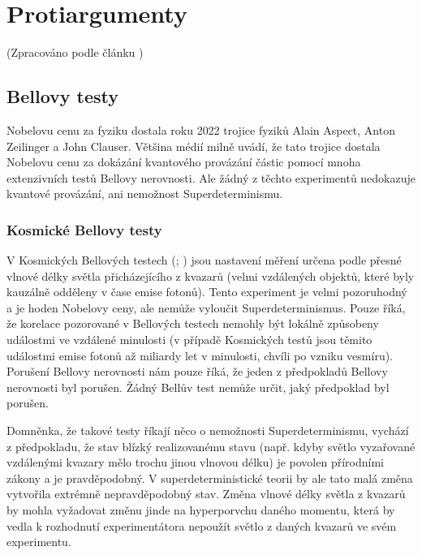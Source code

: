\section{Protiargumenty}
(Zpracováno podle článku \cite{supdet:rethink})
\subsection{Bellovy testy}


Nobelovu cenu za fyziku dostala roku 2022 trojice fyziků Alain Aspect, Anton Zeilinger a John Clauser. Většina médií milně uvádí, že tato trojice dostala Nobelovu cenu za dokázání kvantového provázání částic pomocí mnoha extenzivních testů Bellovy nerovnosti. Ale žádný z těchto experimentů nedokazuje kvantové provázání, ani nemožnost Superdeterminismu.

\subsubsection{Kosmické Bellovy testy}
V Kosmických Bellových testech (\cite{CosBTest:1}; \cite{CosBTest:2}) jsou nastavení měření určena podle přesné vlnové délky světla přicházejícího z kvazarů (velmi vzdálených objektů, které byly kauzálně odděleny v čase emise fotonů). Tento experiment je velmi pozoruhodný a je hoden Nobelovy ceny, ale nemůže vyloučit Superdeterminismus. Pouze říká, že korelace pozorované v Bellových testech nemohly být lokálně způsobeny událostmi ve vzdálené minulosti (v případě Kosmických testů jsou těmito událostmi emise fotonů až miliardy let v minulosti, chvíli po vzniku vesmíru). Porušení Bellovy nerovnosti nám pouze říká, že jeden z předpokladů Bellovy nerovnosti byl porušen. Žádný Bellův test nemůže určit, jaký předpoklad byl porušen.

Domněnka, že takové testy říkají něco o nemožnosti Superdeterminismu, vychází z předpokladu, že stav blízký realizovanému stavu (např. kdyby světlo vyzařované vzdálenými kvazary mělo trochu jinou vlnovou délku) je povolen přírodními zákony a je pravděpodobný. V superdeterministické teorii by ale tato malá změna vytvořila extrémně nepravděpodobný stav. Změna vlnové délky světla z kvazarů by mohla vyžadovat změnu jinde na hyperporvchu daného momentu, která by vedla k rozhodnutí experimentátora nepoužít světlo z daných kvazarů ve svém experimentu.
\clearpage

